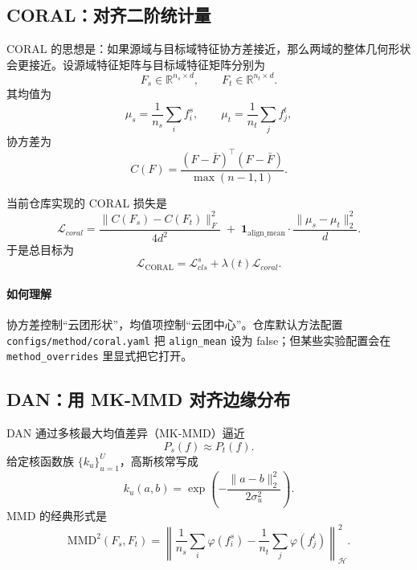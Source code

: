 \documentclass[12pt,a4paper]{ctexart}
\newcommand{\R}{\mathbb{R}}
\begin{document}
\subsection{CORAL：对齐二阶统计量}

CORAL 的思想是：如果源域与目标域特征协方差接近，那么两域的整体几何形状会更接近。设源域特征矩阵与目标域特征矩阵分别为
\begin{equation}
F_s\in \R^{n_s\times d}, \qquad F_t\in \R^{n_t\times d}.
\end{equation}
其均值为
\begin{equation}
\mu_s=\frac{1}{n_s}\sum_i f_i^s,\qquad
\mu_t=\frac{1}{n_t}\sum_j f_j^t,
\end{equation}
协方差为
\begin{equation}
C(F)=\frac{(F-\bar F)^\top(F-\bar F)}{\max(n-1,1)}.
\end{equation}

当前仓库实现的 CORAL 损失是
\begin{equation}
\mathcal{L}_{coral}
=
\frac{\|C(F_s)-C(F_t)\|_F^2}{4d^2}
\;+\;
\mathbf{1}_{\mathrm{align\_mean}}
\cdot
\frac{\|\mu_s-\mu_t\|_2^2}{d}.
\end{equation}
于是总目标为
\begin{equation}
\mathcal{L}_{\mathrm{CORAL}}
=
\mathcal{L}_{cls}^s+\lambda(t)\mathcal{L}_{coral}.
\end{equation}

\paragraph{如何理解} 协方差控制“云团形状”，均值项控制“云团中心”。仓库默认方法配置 \nolinkurl{configs/method/coral.yaml} 把 \texttt{align\_mean} 设为 false；但某些实验配置会在 \texttt{method\allowbreak\_overrides} 里显式把它打开。

\subsection{DAN：用 MK-MMD 对齐边缘分布}

DAN 通过多核最大均值差异（MK-MMD）逼近
\begin{equation}
P_s(f)\approx P_t(f).
\end{equation}
给定核函数族 $\{k_u\}_{u=1}^{U}$，高斯核常写成
\begin{equation}
k_u(a,b)=\exp\left(-\frac{\|a-b\|_2^2}{2\sigma_u^2}\right).
\end{equation}
MMD 的经典形式是
\begin{equation}
\mathrm{MMD}^2(F_s,F_t)
=
\left\|
\frac{1}{n_s}\sum_i \varphi(f_i^s)
-
\frac{1}{n_t}\sum_j \varphi(f_j^t)
\right\|_{\mathcal H}^2.
\end{equation}
\end{document}
